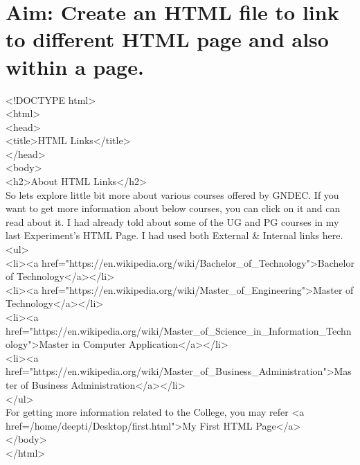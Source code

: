 \section*{\fontsize{16}{14}\selectfont Aim: Create an HTML file to link to different HTML page and also within a page.}
<!DOCTYPE html>\\
<html>\\
<head>\\
<title>HTML Links</title>\\
</head>\\
<body>\\
<h2>About HTML Links</h2>\\
So lets explore little bit more about various courses offered by GNDEC.
If you want to get more information about below courses, you can click on it and can read about it.
I had already told about some of the UG and PG courses in my last Experiment's HTML Page. 
I had used both External \& Internal links here.\\
<ul>\\
<li><a href="https://en.wikipedia.org/wiki/Bachelor\_of\_Technology">Bachelor of Technology</a></li>\\
<li><a href="https://en.wikipedia.org/wiki/Master\_of\_Engineering">Master of Technology</a></li>\\
<li><a href="https://en.wikipedia.org/wiki/Master\_of\_Science\_in\_Information\_Technology">Master in Computer Application</a></li>\\
<li><a href="https://en.wikipedia.org/wiki/Master\_of\_Business\_Administration">Master of Business Administration</a></li>\\
</ul>\\
For getting more information related to the College, you may refer <a href=/home/deepti/Desktop/first.html">My First HTML Page</a>\\
</body>\\
</html>\\



